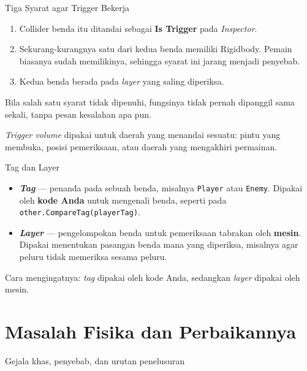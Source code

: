 \documentclass[aspectratio=169,10pt]{beamer}
\begin{document}
\begin{frame}{Tiga Syarat agar Trigger Bekerja}
\begin{enumerate}
  \item Collider benda itu ditandai sebagai \textbf{Is Trigger} pada
        \emph{Inspector}.
  \item Sekurang-kurangnya satu dari kedua benda memiliki Rigidbody. Pemain
        biasanya sudah memilikinya, sehingga syarat ini jarang menjadi
        penyebab.
  \item Kedua benda berada pada \emph{layer} yang saling diperiksa.
\end{enumerate}
\begin{peringatan}
Bila salah satu syarat tidak dipenuhi, fungsinya tidak pernah dipanggil sama
sekali, tanpa pesan kesalahan apa pun.
\end{peringatan}
\begin{kotak}
\emph{Trigger volume} dipakai untuk daerah yang menandai sesuatu: pintu yang
membuka, posisi pemeriksaan, atau daerah yang mengakhiri permainan.
\end{kotak}
\end{frame}

\begin{frame}{Tag dan Layer}
\begin{itemize}
  \item \textbf{\emph{Tag}} --- penanda pada sebuah benda, misalnya
        \texttt{Player} atau \texttt{Enemy}. Dipakai oleh \textbf{kode Anda}
        untuk mengenali benda, seperti pada
        \texttt{other.CompareTag(playerTag)}.
  \item \textbf{\emph{Layer}} --- pengelompokan benda untuk pemeriksaan tabrakan
        oleh \textbf{mesin}. Dipakai menentukan pasangan benda mana yang
        diperiksa, misalnya agar peluru tidak memeriksa sesama peluru.
\end{itemize}
\vspace{0.15cm}
\begin{kotak}
Cara mengingatnya: \emph{tag} dipakai oleh kode Anda, sedangkan \emph{layer}
dipakai oleh mesin.
\end{kotak}
\end{frame}

\section{Masalah Fisika dan Perbaikannya}
  {Gejala khas, penyebab, dan urutan penelusuran}
\end{document}
